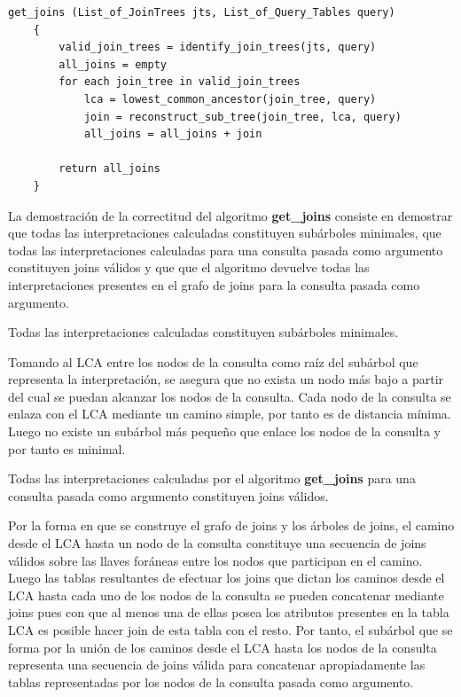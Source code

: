 \begin{lstlisting}[label={querytime}, caption={Pseudoc\'odigo del algoritmo de inferencia de joins}]
    get_joins (List_of_JoinTrees jts, List_of_Query_Tables query)
    {
        valid_join_trees = identify_join_trees(jts, query)
        all_joins = empty
        for each join_tree in valid_join_trees
            lca = lowest_common_ancestor(join_tree, query)
            join = reconstruct_sub_tree(join_tree, lca, query)
            all_joins = all_joins + join

        return all_joins
    }
\end{lstlisting}

La demostración de la correctitud del algoritmo \textbf{get\_joins} consiste en demostrar 
que todas las interpretaciones calculadas constituyen sub\'arboles minimales, que todas las interpretaciones calculadas
para una consulta pasada como argumento constituyen 
joins v\'alidos y que que el algoritmo devuelve todas las interpretaciones presentes en el grafo de joins 
para la consulta pasada como argumento.

\begin{theorem}
    Todas las interpretaciones calculadas constituyen subárboles minimales.
\end{theorem}

Tomando al LCA entre los nodos de la consulta como raíz del subárbol que representa la interpretaci\'on, 
se asegura que no exista un nodo m\'as bajo a partir del cual se puedan alcanzar los nodos de la consulta. 
Cada nodo de la consulta se enlaza con el LCA mediante un camino simple, por tanto es de distancia m\'inima.
Luego no existe un subárbol m\'as pequeño que enlace los nodos de la consulta y por tanto es minimal. 


\begin{theorem}
    Todas las interpretaciones calculadas por el algoritmo \textbf{get\_joins} para una consulta pasada como 
    argumento constituyen joins v\'alidos.
\end{theorem}

Por la forma en que se construye el grafo de joins y los \'arboles de joins, el camino desde el 
LCA hasta un nodo de la consulta constituye una secuencia de joins v\'alidos sobre las llaves for\'aneas entre los 
nodos que participan en el camino. Luego las tablas resultantes de efectuar los joins que dictan los caminos 
desde el LCA hasta cada uno de los nodos de la consulta se pueden concatenar mediante joins pues con que al menos una de ellas posea 
los atributos presentes en la tabla LCA es posible hacer join de esta tabla con el resto. Por tanto, el sub\'arbol que se forma por la uni\'on de los 
caminos desde el LCA hasta los nodos de la consulta representa una secuencia de joins v\'alida para concatenar 
apropiadamente las tablas representadas por los nodos de la consulta pasada como argumento. 

